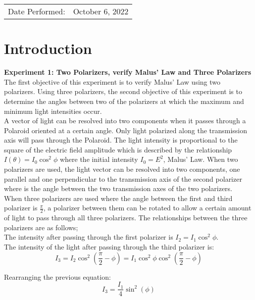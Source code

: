 \documentclass[
	letterpaper, %
	10pt, %
]{CSUniSchoolLabReport}
\title{}
\author{Sebastien \textsc{Psarianos}\\ Sofiya \textsc{P'yavka}}
\date{\today}
\begin{document}
\maketitle

\begin{center}
	\begin{tabular}{l r}
		Date Performed: & October 6, 2022 \\
	\end{tabular}
\end{center}
\section{Introduction}
\textbf{Experiment 1: Two Polarizers, verify Malus’ Law and Three Polarizers}
The first objective of this experiment is to verify Malus' Law using two polarizers. Using three polarizers, the second objective of this experiment is to determine the angles between two of the polarizers at which the maximum and minimum light intensities occur.\\

A vector of light can be resolved into two components when it passes through a Polaroid oriented at a certain angle. Only light polarized along the transmission axis will pass through the Polaroid. The light intensity is proportional to the square of the electric field amplitude which is described by the relationship $I(\theta)= I_0\cos^2\phi$ where the initial intensity $I_0=E^2$, Malus' Law. When two polarizers are used, the light vector can be resolved into two components, one parallel and one perpendicular to the transmission axis of the second polarizer where  is the angle between the two transmission axes of the two polarizers.\\

When three polarizers are used where the angle between the first and third polarizer is $\frac \pi2$, a polarizer between them can be rotated to allow a certain amount of light to pass through all three polarizers. The relationships between the three polarizers are as follows;\\

The intensity after passing through the first polarizer is $I_2=I_1\cos^2\phi$.\\

The intensity of the light after passing through the third polarizer is:
$$I_3=I_2\cos^2\left(\frac \pi2 - \phi\right)=I_1\cos^2\phi\cos^2\left(\frac\pi2 - \phi\right)$$

Rearranging the previous equation:
$$I_3=\frac{I_1}4\sin^2(\phi)$$
\end{document}
